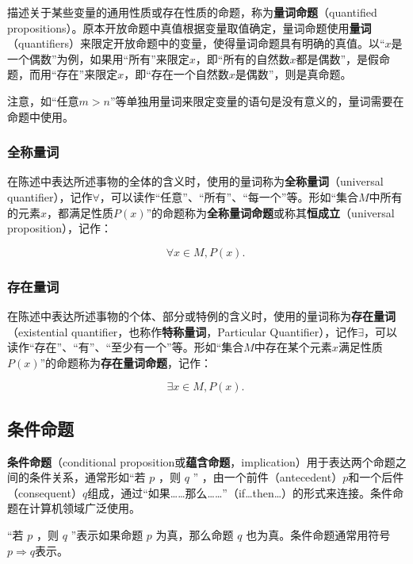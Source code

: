 描述关于某些变量的通用性质或存在性质的命题，称为\textbf{量词命题}（quantified propositions）。原本开放命题中真值根据变量取值确定，量词命题使用\textbf{量词}（quantifiers）来限定开放命题中的变量，使得量词命题具有明确的真值。以“$x$是一个偶数”为例，如果用“所有”来限定$x$，即“所有的自然数$x$都是偶数”，是假命题，而用“存在”来限定$x$，即“存在一个自然数$x$是偶数”，则是真命题。

注意，如“任意$m>n$”等单独用量词来限定变量的语句是没有意义的，量词需要在命题中使用。

\subsubsection{全称量词}

在陈述中表达所述事物的全体的含义时，使用的量词称为\textbf{全称量词}（universal quantifier），记作$\forall$，可以读作“任意”、“所有”、“每一个”等。形如“集合$M$中所有的元素$x$，都满足性质$P(x)$”的命题称为\textbf{全称量词命题}或称其\textbf{恒成立}（universal proposition），记作：

\begin{equation}
\forall x\in M,P(x).~
\end{equation}

\subsubsection{存在量词}

在陈述中表达所述事物的个体、部分或特例的含义时，使用的量词称为\textbf{存在量词}（existential quantifier，也称作\textbf{特称量词}，Particular Quantifier），记作$\exists$，可以读作“存在”、“有”、“至少有一个”等。形如“集合$M$中存在某个元素$x$满足性质$P(x)$”的命题称为\textbf{存在量词命题}，记作：

\begin{equation}
\exists x\in M,P(x).~
\end{equation}

\subsection{条件命题}

\textbf{条件命题}（conditional proposition或\textbf{蕴含命题}，implication）用于表达两个命题之间的条件关系，通常形如“若 $p$ ，则 $q$ ” ，由一个前件（antecedent）$p$和一个后件（consequent）$q$组成，通过“如果……那么……”（if…then…）的形式来连接。条件命题在计算机领域广泛使用。

“若 $p$ ，则 $q$ ”表示如果命题 $p$ 为真，那么命题 $q$ 也为真。条件命题通常用符号$p\Rightarrow q$表示。

